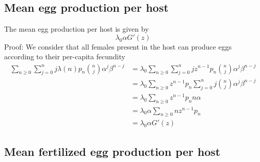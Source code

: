 \documentclass[useAMS,referee,usenatbib]{biom}
\begin{document}
\subsection{Mean egg production per host}
	The mean egg production per host is given by
	\begin{equation}\label{prodhuevos}
	\lambda_0\alpha G'(z)
	\end{equation}
		Proof: We consider that all females present in the host can produce eggs according to their  per-capita fecundity
		\begin{equation*}
		\begin{split}
		\sum_{n\geq 0}\sum_{j=0}^{n}j\lambda(n)p_n\binom{n}{j}\alpha^j\beta^{n-j}
		&=\lambda_0\sum_{n\geq 0}\sum_{j=0}^{n}jz^{n-1}p_n\binom{n}{j}\alpha^j\beta^{n-j}\\
		&=\lambda_0\sum_{n\geq 0}z^{n-1}p_n\sum_{j=0}^{n} j\binom{n}{j}\alpha^j\beta^{n-j}\\
		&=\lambda_0\sum_{n\geq 0}z^{n-1}p_nn\alpha\\
		&=\lambda_0\alpha  \sum_{n\geq 0}nz^{n-1}p_n \\
		&=\lambda_0\alpha G'(z)
		\end{split}
		\end{equation*}

\subsection{Mean fertilized egg production per host}
	
\end{document}
